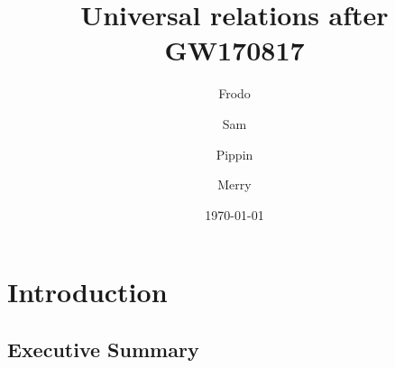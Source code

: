 \documentclass[prd,twocolumn,nofootinbib,superscriptaddress,amsmath,amssymb]{revtex4-1}
\begin{document}
\title{Universal relations after GW170817}

\author{Frodo}
\affiliation{}

\author{Sam}
\affiliation{}

\author{Pippin}
\affiliation{}

\author{Merry}
\affiliation{}


\date{\today}

\begin{abstract}

\end{abstract}

\maketitle


\section{Introduction}\label{sec:intro}

\subsection{Executive Summary}

\end{document}
